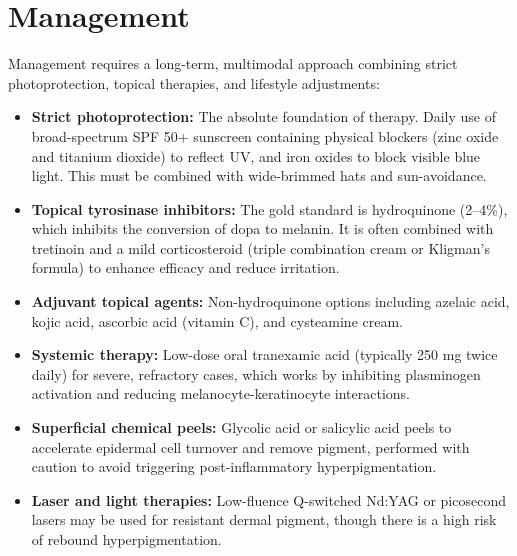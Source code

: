 \section*{Management}
Management requires a long-term, multimodal approach combining strict photoprotection, topical therapies, and lifestyle adjustments:
\begin{itemize}
    \item \textbf{Strict photoprotection:} The absolute foundation of therapy. Daily use of broad-spectrum SPF 50+ sunscreen containing physical blockers (zinc oxide and titanium dioxide) to reflect UV, and iron oxides to block visible blue light. This must be combined with wide-brimmed hats and sun-avoidance.
    \item \textbf{Topical tyrosinase inhibitors:} The gold standard is hydroquinone (2--4\%), which inhibits the conversion of dopa to melanin. It is often combined with tretinoin and a mild corticosteroid (triple combination cream or Kligman's formula) to enhance efficacy and reduce irritation.
    \item \textbf{Adjuvant topical agents:} Non-hydroquinone options including azelaic acid, kojic acid, ascorbic acid (vitamin C), and cysteamine cream.
    \item \textbf{Systemic therapy:} Low-dose oral tranexamic acid (typically 250 mg twice daily) for severe, refractory cases, which works by inhibiting plasminogen activation and reducing melanocyte-keratinocyte interactions.
    \item \textbf{Superficial chemical peels:} Glycolic acid or salicylic acid peels to accelerate epidermal cell turnover and remove pigment, performed with caution to avoid triggering post-inflammatory hyperpigmentation.
    \item \textbf{Laser and light therapies:} Low-fluence Q-switched Nd:YAG or picosecond lasers may be used for resistant dermal pigment, though there is a high risk of rebound hyperpigmentation.
\end{itemize}

